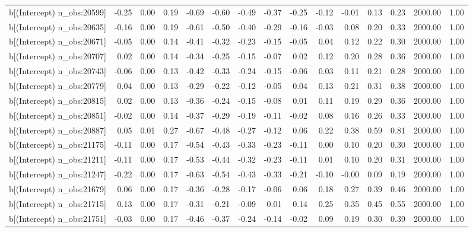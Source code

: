 \begin{table}[ht]
\begin{tabular}{rrrrrrrrrrrrrrr}
  b[(Intercept) n\_obs:20599] & -0.25 & 0.00 & 0.19 & -0.69 & -0.60 & -0.49 & -0.37 & -0.25 & -0.12 & -0.01 & 0.13 & 0.23 & 2000.00 & 1.00 \\ 
  b[(Intercept) n\_obs:20635] & -0.16 & 0.00 & 0.19 & -0.61 & -0.50 & -0.40 & -0.29 & -0.16 & -0.03 & 0.08 & 0.20 & 0.33 & 2000.00 & 1.00 \\ 
  b[(Intercept) n\_obs:20671] & -0.05 & 0.00 & 0.14 & -0.41 & -0.32 & -0.23 & -0.15 & -0.05 & 0.04 & 0.12 & 0.22 & 0.30 & 2000.00 & 1.00 \\ 
  b[(Intercept) n\_obs:20707] & 0.02 & 0.00 & 0.14 & -0.34 & -0.25 & -0.15 & -0.07 & 0.02 & 0.12 & 0.20 & 0.28 & 0.36 & 2000.00 & 1.00 \\ 
  b[(Intercept) n\_obs:20743] & -0.06 & 0.00 & 0.13 & -0.42 & -0.33 & -0.24 & -0.15 & -0.06 & 0.03 & 0.11 & 0.21 & 0.28 & 2000.00 & 1.00 \\ 
  b[(Intercept) n\_obs:20779] & 0.04 & 0.00 & 0.13 & -0.29 & -0.22 & -0.12 & -0.05 & 0.04 & 0.13 & 0.21 & 0.31 & 0.38 & 2000.00 & 1.00 \\ 
  b[(Intercept) n\_obs:20815] & 0.02 & 0.00 & 0.13 & -0.36 & -0.24 & -0.15 & -0.08 & 0.01 & 0.11 & 0.19 & 0.29 & 0.36 & 2000.00 & 1.00 \\ 
  b[(Intercept) n\_obs:20851] & -0.02 & 0.00 & 0.14 & -0.37 & -0.29 & -0.19 & -0.11 & -0.02 & 0.08 & 0.16 & 0.26 & 0.33 & 2000.00 & 1.00 \\ 
  b[(Intercept) n\_obs:20887] & 0.05 & 0.01 & 0.27 & -0.67 & -0.48 & -0.27 & -0.12 & 0.06 & 0.22 & 0.38 & 0.59 & 0.81 & 2000.00 & 1.00 \\ 
  b[(Intercept) n\_obs:21175] & -0.11 & 0.00 & 0.17 & -0.54 & -0.43 & -0.33 & -0.23 & -0.11 & 0.00 & 0.10 & 0.20 & 0.30 & 2000.00 & 1.00 \\ 
  b[(Intercept) n\_obs:21211] & -0.11 & 0.00 & 0.17 & -0.53 & -0.44 & -0.32 & -0.23 & -0.11 & 0.01 & 0.10 & 0.20 & 0.31 & 2000.00 & 1.00 \\ 
  b[(Intercept) n\_obs:21247] & -0.22 & 0.00 & 0.17 & -0.63 & -0.54 & -0.43 & -0.33 & -0.21 & -0.10 & -0.00 & 0.09 & 0.19 & 2000.00 & 1.00 \\ 
  b[(Intercept) n\_obs:21679] & 0.06 & 0.00 & 0.17 & -0.36 & -0.28 & -0.17 & -0.06 & 0.06 & 0.18 & 0.27 & 0.39 & 0.46 & 2000.00 & 1.00 \\ 
  b[(Intercept) n\_obs:21715] & 0.13 & 0.00 & 0.17 & -0.31 & -0.21 & -0.09 & 0.01 & 0.14 & 0.25 & 0.35 & 0.45 & 0.55 & 2000.00 & 1.00 \\ 
  b[(Intercept) n\_obs:21751] & -0.03 & 0.00 & 0.17 & -0.46 & -0.37 & -0.24 & -0.14 & -0.02 & 0.09 & 0.19 & 0.30 & 0.39 & 2000.00 & 1.00 \\ 

\end{tabular}
\end{table}
